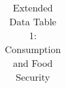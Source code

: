 \begin{longtable}{llcccccccccc}
\caption{Extended Data Table 1: Consumption and Food Security} \label{tab:pap__a1} \\                                                                                                                                                                                                                                                                                                                                                                                                                                                                                                                                                                                                                                                                                                                                                                                                                             
\hline \hline                                                                                                                                                                                                                                                                                                                                                                                                                                                                                                                                                                                                                                                                                                                                                                                                                                                                                                     

\end{longtable}
